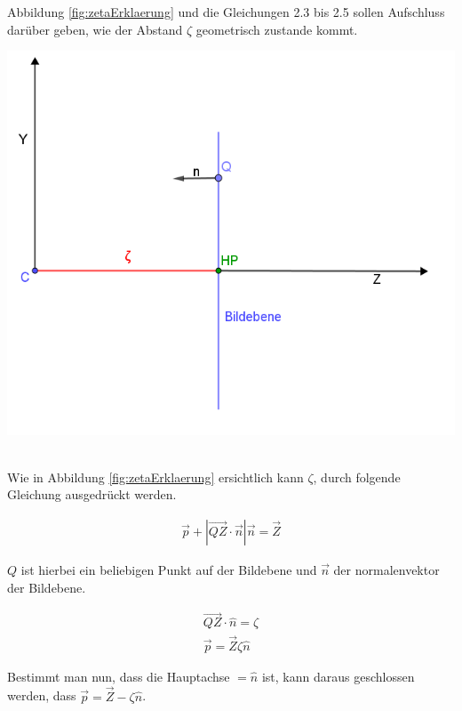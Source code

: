 Abbildung \ref{fig:zetaErklaerung} und die Gleichungen 2.3 bis 2.5 sollen Aufschluss darüber geben, wie der Abstand $\zeta$ geometrisch zustande kommt. 

\begin{minipage}{\linewidth}
	\centering
	\includegraphics[width=.8\linewidth]{images/ZetaHerleitung.png}
	\label{fig:zetaErklaerung}
\end{minipage}\\

Wie in Abbildung \ref{fig:zetaErklaerung} ersichtlich kann $\zeta$, durch folgende Gleichung ausgedrückt werden.

\begin{gather}
\vec{p}+|\vec{QZ} \cdot \vec{n}|\vec{n} = \vec{Z}
\end{gather}

$Q$ ist hierbei ein beliebigen Punkt auf der Bildebene und $\vec{n}$ der normalenvektor der Bildebene.

\begin{gather}
\vec{QZ} \cdot \hat{n} = \zeta\\
\vec{p}= \vec{Z}\zeta \hat{n}
\end{gather}

Bestimmt man nun, dass die Hauptachse $= \hat{n}$ ist, kann daraus geschlossen werden, dass $\vec{p} = \vec{Z} - \zeta \hat{n}$.


